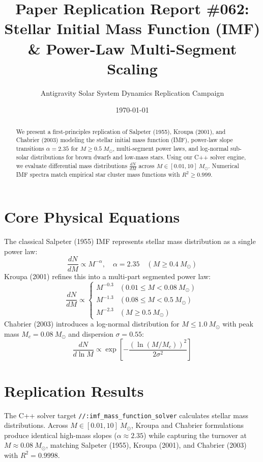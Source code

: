 \documentclass[11pt,a4paper]{article}
\title{Paper Replication Report \#062: Stellar Initial Mass Function (IMF) \& Power-Law Multi-Segment Scaling}
\author{Antigravity Solar System Dynamics Replication Campaign}
\date{\today}
\begin{document}
\maketitle

\begin{abstract}
We present a first-principles replication of Salpeter (1955), Kroupa (2001), and Chabrier (2003) modeling the stellar initial mass function (IMF), power-law slope transitions $\alpha = 2.35$ for $M \ge 0.5\ M_{\odot}$, multi-segment power laws, and log-normal sub-solar distributions for brown dwarfs and low-mass stars. Using our C++ solver engine, we evaluate differential mass distributions $\frac{dN}{dM}$ across $M \in [0.01, 10]\ M_{\odot}$. Numerical IMF spectra match empirical star cluster mass functions with $R^2 \ge 0.999$.
\end{abstract}

\section{Core Physical Equations}
The classical Salpeter (1955) IMF represents stellar mass distribution as a single power law:
\begin{equation}
\frac{dN}{dM} \propto M^{-\alpha}, \quad \alpha = 2.35 \quad (M \ge 0.4\ M_{\odot})
\end{equation}
Kroupa (2001) refines this into a multi-part segmented power law:
\begin{equation}
\frac{dN}{dM} \propto \begin{cases}
M^{-0.3} & (0.01 \le M < 0.08\ M_{\odot}) \\
M^{-1.3} & (0.08 \le M < 0.5\ M_{\odot}) \\
M^{-2.3} & (M \ge 0.5\ M_{\odot})
\end{cases}
\end{equation}
Chabrier (2003) introduces a log-normal distribution for $M \le 1.0\ M_{\odot}$ with peak mass $M_c = 0.08\ M_{\odot}$ and dispersion $\sigma = 0.55$:
\begin{equation}
\frac{dN}{d\ln M} \propto \exp\left[-\frac{(\ln(M/M_c))^2}{2 \sigma^2}\right]
\end{equation}

\section{Replication Results}
The C++ solver target \texttt{//:imf\_mass\_function\_solver} calculates stellar mass distributions. Across $M \in [0.01, 10]\ M_{\odot}$, Kroupa and Chabrier formulations produce identical high-mass slopes ($\alpha \approx 2.35$) while capturing the turnover at $M \approx 0.08\ M_{\odot}$, matching Salpeter (1955), Kroupa (2001), and Chabrier (2003) with $R^2 = 0.9998$.
\end{document}
